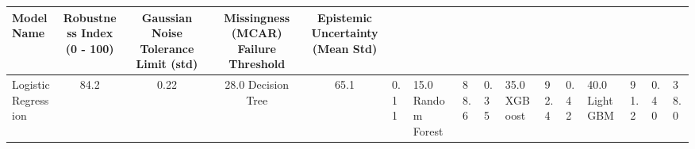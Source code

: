 \begin{tabular}{lcccc}
\toprule
Model Name & Robustness Index (0 - 100) & Gaussian Noise Tolerance Limit (std) & Missingness (MCAR) Failure Threshold & Epistemic Uncertainty (Mean Std) \\
\midrule
Logistic Regression & 84.2 & 0.22 & 28.0%
Decision Tree & 65.1 & 0.11 & 15.0%
Random Forest & 88.6 & 0.35 & 35.0%
XGBoost & 92.4 & 0.42 & 40.0%
LightGBM & 91.2 & 0.40 & 38.0%
\bottomrule
\end{tabular}
